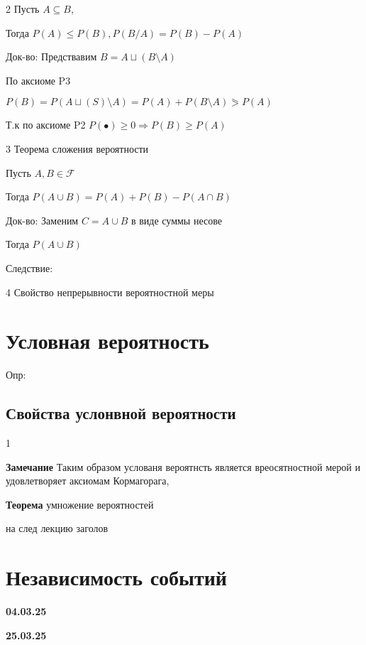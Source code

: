 \documentclass{article}
\begin{document}
2 Пусть $A \subseteq B $,

Тогда $P(A) \leqslant P(B), P(B/A) = P(B) - P(A)$

Док-во: Предствавим $B=A \sqcup (B \setminus  A)$

По аксиоме P3

$P(B) = P(A \sqcup (S) \setminus A ) = P(A)+P(B \setminus A) \eqslantgtr P(A)$

Т.к по аксиоме P2 $P(\bullet ) \geq 0 \Rightarrow P(B) \geq P(A)$

\vspace{5mm}

3 Теорема сложения вероятности

Пусть  $A,B \in \mathcal{F}$

Тогда $P(A\cup B) = P(A) + P(B) - P(A \cap  B)$

Док-во: Заменим $C = A \cup  B$ в виде суммы несове

Тогда $P(A\cup B) $

Следствие:

\vspace{5mm}

4 Свойство непрерывности вероятностной меры



\vspace{5mm}


\section{Условная вероятность}




Опр:




\subsection{Свойства услонвной вероятности}

1 




\textbf{Замечание} Таким образом услованя вероятнсть является вреосятностной мерой 
и удовлетворяет аксиомам Кормагорага,



\textbf{Теорема} умножение вероятностей


на след лекцию заголов

\section{Независимость событий}





\textbf{04.03.25}


\textbf{25.03.25}
\end{document}

